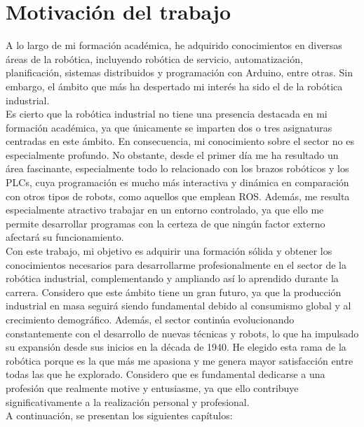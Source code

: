 \section{Motivación del trabajo}
\label{sec:quintaseccion}

A lo largo de mi formación académica, he adquirido conocimientos en diversas áreas de la robótica, incluyendo robótica de servicio, automatización, planificación, sistemas distribuidos y programación con Arduino, entre otras. Sin embargo, el ámbito que más ha despertado mi interés ha sido el de la robótica industrial. \\

Es cierto que la robótica industrial no tiene una presencia destacada en mi formación académica, ya que únicamente se imparten dos o tres asignaturas centradas en este ámbito. En consecuencia, mi conocimiento sobre el sector no es especialmente profundo. No obstante, desde el primer día me ha resultado un área fascinante, especialmente todo lo relacionado con los brazos robóticos y los PLCs, cuya programación es mucho más interactiva y dinámica en comparación con otros tipos de robots, como aquellos que emplean ROS. Además, me resulta especialmente atractivo trabajar en un entorno controlado, ya que ello me permite desarrollar programas con la certeza de que ningún factor externo afectará su funcionamiento. \\

Con este trabajo, mi objetivo es adquirir una formación sólida y obtener los conocimientos necesarios para desarrollarme profesionalmente en el sector de la robótica industrial, complementando y ampliando así lo aprendido durante la carrera. Considero que este ámbito tiene un gran futuro, ya que la producción industrial en masa seguirá siendo fundamental debido al consumismo global y al crecimiento demográfico. Además, el sector continúa evolucionando constantemente con el desarrollo de nuevas técnicas y robots, lo que ha impulsado su expansión desde sus inicios en la década de 1940. He elegido esta rama de la robótica porque es la que más me apasiona y me genera mayor satisfacción entre todas las que he explorado. Considero que es fundamental dedicarse a una profesión que realmente motive y entusiasme, ya que ello contribuye significativamente a la realización personal y profesional. \\

A continuación, se presentan los siguientes capítulos:

